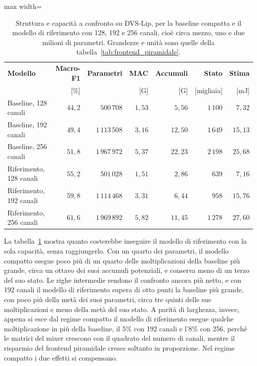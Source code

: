 \begin{table}[t]
\centering
\small
\renewcommand{\arraystretch}{1.2}
\caption[Struttura e capacità a confronto su DVS-Lip]{Struttura e capacità a confronto su DVS-Lip, per la baseline compatta e il modello di riferimento con 128, 192 e 256 canali, cioè circa mezzo, uno e due milioni di parametri. Grandezze e unità sono quelle della tabella~\ref{tab:frontend_piramidale}.}
\label{tab:capacita_lip}
\begin{adjustbox}{max width=\textwidth}
\begin{tabular}{@{}l r r r r r r@{}}
\hline
\textbf{Modello} & \textbf{Macro-F1} & \textbf{Parametri} & \textbf{MAC} & \textbf{Accumuli} & \textbf{Stato} & \textbf{Stima} \\
 & [\%] & & [G] & [G] & [migliaia] & [mJ] \\
\hline
Baseline, 128 canali & $44{,}2$ & $500\,708$ & $1{,}53$ & $5{,}56$ & $1\,100$ & $7{,}32$ \\
Baseline, 192 canali & $49{,}4$ & $1\,113\,508$ & $3{,}16$ & $12{,}50$ & $1\,649$ & $15{,}13$ \\
Baseline, 256 canali & $51{,}8$ & $1\,967\,972$ & $5{,}37$ & $22{,}23$ & $2\,198$ & $25{,}68$ \\
\hline
Riferimento, 128 canali & $55{,}2$ & $501\,028$ & $1{,}51$ & $2{,}86$ & $639$ & $7{,}16$ \\
Riferimento, 192 canali & $59{,}8$ & $1\,114\,468$ & $3{,}31$ & $6{,}44$ & $958$ & $15{,}76$ \\
Riferimento, 256 canali & $61{,}6$ & $1\,969\,892$ & $5{,}82$ & $11{,}45$ & $1\,278$ & $27{,}60$ \\
\hline
\end{tabular}
\end{adjustbox}
\end{table}

La tabella~\ref{tab:capacita_lip} mostra quanto costerebbe inseguire il modello di riferimento con la sola capacità, senza raggiungerlo. Con un quarto dei parametri, il modello compatto esegue poco più di un quarto delle moltiplicazioni della baseline più grande, circa un ottavo dei suoi accumuli potenziali, e conserva meno di un terzo del suo stato. Le righe intermedie rendono il confronto ancora più netto, e con 192 canali il modello di riferimento supera di otto punti la baseline più grande, con poco più della metà dei suoi parametri, circa tre quinti delle sue moltiplicazioni e meno della metà del suo stato. A parità di larghezza, invece, appena si esce dal regime compatto il modello di riferimento esegue qualche moltiplicazione in più della baseline, il $5\%$ con 192 canali e l'$8\%$ con 256, perché le matrici del mixer crescono con il quadrato del numero di canali, mentre il risparmio del frontend piramidale cresce soltanto in proporzione. Nel regime compatto i due effetti si compensano.

